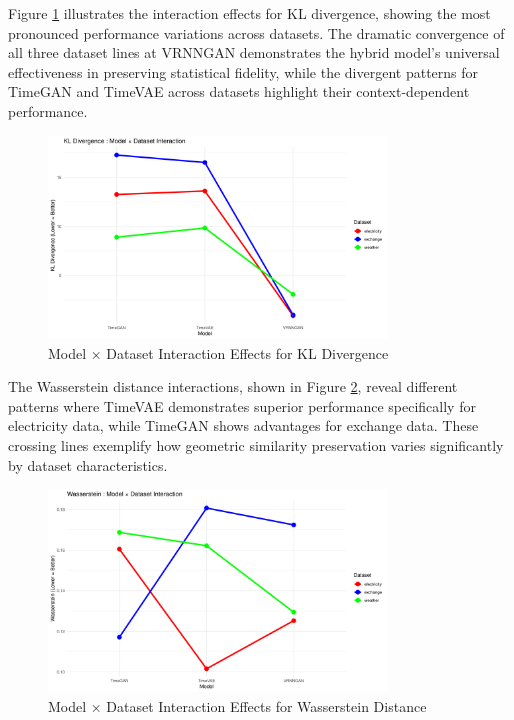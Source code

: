 \documentclass[11pt]{article}
\begin{document}
Figure \ref{fig:kl_interaction} illustrates the interaction effects for KL divergence, showing the most pronounced performance variations across datasets. The dramatic convergence of all three dataset lines at VRNNGAN demonstrates the hybrid model's universal effectiveness in preserving statistical fidelity, while the divergent patterns for TimeGAN and TimeVAE across datasets highlight their context-dependent performance.

\begin{figure}[H]
\centering
\includegraphics[width=0.8\textwidth]{assets/interaction_kl.png}
\caption{Model × Dataset Interaction Effects for KL Divergence}
\label{fig:kl_interaction}
\end{figure}

The Wasserstein distance interactions, shown in Figure \ref{fig:wasserstein_interaction}, reveal different patterns where TimeVAE demonstrates superior performance specifically for electricity data, while TimeGAN shows advantages for exchange data. These crossing lines exemplify how geometric similarity preservation varies significantly by dataset characteristics.

\begin{figure}[H]
\centering
\includegraphics[width=0.8\textwidth]{assets/interaction_wasserstein.png}
\caption{Model × Dataset Interaction Effects for Wasserstein Distance}
\label{fig:wasserstein_interaction}
\end{figure}
\end{document}
